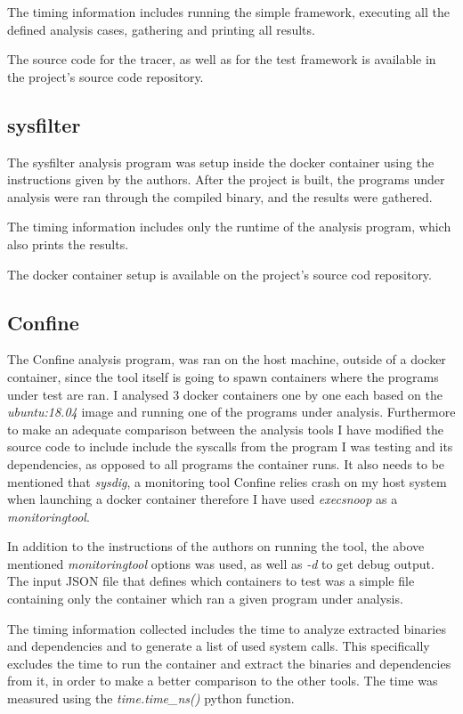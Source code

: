 The timing information includes running the simple framework, executing all the defined analysis cases, gathering and printing all results.

The source code for the tracer, as well as for the test framework is available in the project's source code repository.

\subsection {sysfilter}
The sysfilter \cite{ref_sp_3} analysis program was setup inside the docker container using the instructions given by the authors.
After the project is built, the programs under analysis were ran through the compiled binary, and the results were gathered.

The timing information includes only the runtime of the analysis program, which also prints the results.

The docker container setup is available on the project's source cod repository.

\subsection {Confine}
The Confine \cite{ref_sp_2} analysis program, was ran on the host machine, outside of a docker container, since the tool itself is going to spawn containers where the programs under test are ran.
I analysed 3 docker containers one by one each based on the \textit{ubuntu:18.04} image and running one of the programs under analysis.
Furthermore to make an adequate comparison between the analysis tools I have modified the source code to include include the syscalls from the program I was testing and its dependencies, as opposed to all programs the container runs.
It also needs to be mentioned that \textit{sysdig}, a monitoring tool Confine relies crash on my host system when launching a docker container therefore I have used \textit{execsnoop} as a \textit{monitoringtool}.

In addition to the instructions of the authors on running the tool, the above mentioned \textit{monitoringtool} options was used, as well as \textit{-d} to get debug output.
The input JSON file that defines which containers to test was a simple file containing only the container which ran a given program under analysis.

The timing information collected includes the time to analyze extracted binaries and dependencies and to generate a list of used system calls. This specifically excludes the time to run the container and extract the binaries and dependencies from it, in order to make a better comparison to the other tools. The time was measured using the \textit{time.time\_ns()} python function.

